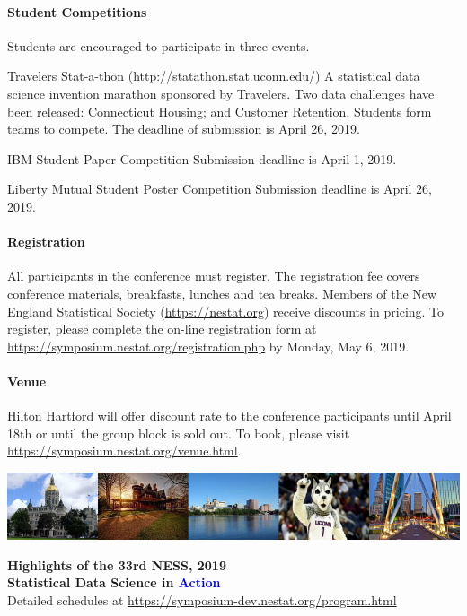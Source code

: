\documentclass[12pt]{article}
\newcommand{\blue}[1]{{\textcolor{blue}{#1}}}
\begin{document}
\paragraph{Student Competitions} Students are encouraged to participate in three events.

\textsf{Travelers Stat-a-thon} (\url{http://statathon.stat.uconn.edu/})
A statistical data science invention marathon sponsored by Travelers. Two data challenges have been released: Connecticut Housing; and Customer Retention. Students form teams to compete. The deadline of submission is April 26, 2019.

\textsf{IBM Student Paper Competition} Submission deadline is April 1, 2019.

\textsf{Liberty Mutual Student Poster Competition} Submission deadline is April 26, 2019.


\paragraph{Registration}
All participants in the conference must register. The registration fee
covers conference materials, breakfasts, lunches and tea
breaks. Members of the New England Statistical Society
(\url{https://nestat.org}) receive discounts in pricing. To register,
please complete the on-line registration form at
\url{https://symposium.nestat.org/registration.php}
by Monday, May 6, 2019.


\paragraph{Venue}
Hilton Hartford will offer discount rate to the conference
participants until April 18th or until the group block is sold out. To
book, please visit
\url{https://symposium.nestat.org/venue.html}.


\vfill

\begin{center}
\includegraphics[width=\textwidth]{hartford-banner}
\end{center}


\newpage

\begin{center}
  {\bf\LARGE Highlights of the 33rd NESS, 2019\\[1ex]
    Statistical Data Science in \blue{\Huge Action}}\\[1ex]

  Detailed schedules at \url{https://symposium-dev.nestat.org/program.html}
\end{center}
\end{document}
